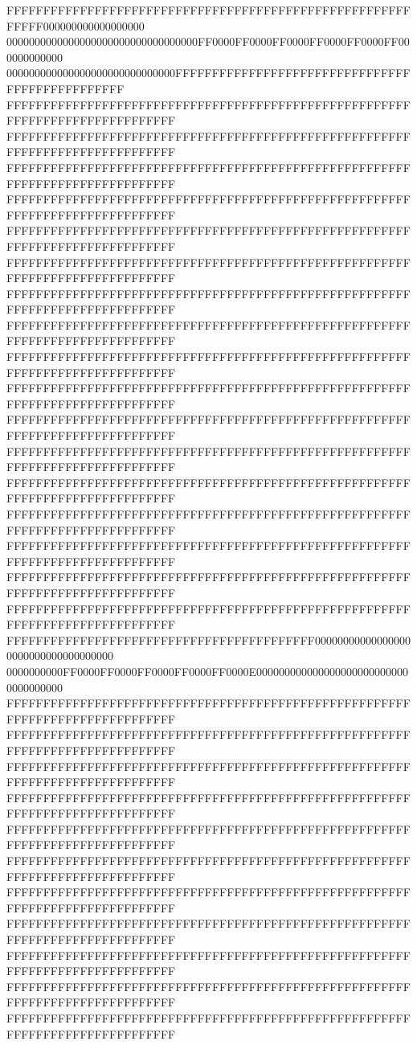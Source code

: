 FFFFFFFFFFFFFFFFFFFFFFFFFFFFFFFFFFFFFFFFFFFFFFFFFFFFFFFFFFFF000000000000000000
0000000000000000000000000000000000FF0000FF0000FF0000FF0000FF0000FF000000000000
000000000000000000000000000000FFFFFFFFFFFFFFFFFFFFFFFFFFFFFFFFFFFFFFFFFFFFFFFF
FFFFFFFFFFFFFFFFFFFFFFFFFFFFFFFFFFFFFFFFFFFFFFFFFFFFFFFFFFFFFFFFFFFFFFFFFFFFFF
FFFFFFFFFFFFFFFFFFFFFFFFFFFFFFFFFFFFFFFFFFFFFFFFFFFFFFFFFFFFFFFFFFFFFFFFFFFFFF
FFFFFFFFFFFFFFFFFFFFFFFFFFFFFFFFFFFFFFFFFFFFFFFFFFFFFFFFFFFFFFFFFFFFFFFFFFFFFF
FFFFFFFFFFFFFFFFFFFFFFFFFFFFFFFFFFFFFFFFFFFFFFFFFFFFFFFFFFFFFFFFFFFFFFFFFFFFFF
FFFFFFFFFFFFFFFFFFFFFFFFFFFFFFFFFFFFFFFFFFFFFFFFFFFFFFFFFFFFFFFFFFFFFFFFFFFFFF
FFFFFFFFFFFFFFFFFFFFFFFFFFFFFFFFFFFFFFFFFFFFFFFFFFFFFFFFFFFFFFFFFFFFFFFFFFFFFF
FFFFFFFFFFFFFFFFFFFFFFFFFFFFFFFFFFFFFFFFFFFFFFFFFFFFFFFFFFFFFFFFFFFFFFFFFFFFFF
FFFFFFFFFFFFFFFFFFFFFFFFFFFFFFFFFFFFFFFFFFFFFFFFFFFFFFFFFFFFFFFFFFFFFFFFFFFFFF
FFFFFFFFFFFFFFFFFFFFFFFFFFFFFFFFFFFFFFFFFFFFFFFFFFFFFFFFFFFFFFFFFFFFFFFFFFFFFF
FFFFFFFFFFFFFFFFFFFFFFFFFFFFFFFFFFFFFFFFFFFFFFFFFFFFFFFFFFFFFFFFFFFFFFFFFFFFFF
FFFFFFFFFFFFFFFFFFFFFFFFFFFFFFFFFFFFFFFFFFFFFFFFFFFFFFFFFFFFFFFFFFFFFFFFFFFFFF
FFFFFFFFFFFFFFFFFFFFFFFFFFFFFFFFFFFFFFFFFFFFFFFFFFFFFFFFFFFFFFFFFFFFFFFFFFFFFF
FFFFFFFFFFFFFFFFFFFFFFFFFFFFFFFFFFFFFFFFFFFFFFFFFFFFFFFFFFFFFFFFFFFFFFFFFFFFFF
FFFFFFFFFFFFFFFFFFFFFFFFFFFFFFFFFFFFFFFFFFFFFFFFFFFFFFFFFFFFFFFFFFFFFFFFFFFFFF
FFFFFFFFFFFFFFFFFFFFFFFFFFFFFFFFFFFFFFFFFFFFFFFFFFFFFFFFFFFFFFFFFFFFFFFFFFFFFF
FFFFFFFFFFFFFFFFFFFFFFFFFFFFFFFFFFFFFFFFFFFFFFFFFFFFFFFFFFFFFFFFFFFFFFFFFFFFFF
FFFFFFFFFFFFFFFFFFFFFFFFFFFFFFFFFFFFFFFFFFFFFFFFFFFFFFFFFFFFFFFFFFFFFFFFFFFFFF
FFFFFFFFFFFFFFFFFFFFFFFFFFFFFFFFFFFFFFFFFF000000000000000000000000000000000000
0000000000FF0000FF0000FF0000FF0000FF0000E0000000000000000000000000000000000000
FFFFFFFFFFFFFFFFFFFFFFFFFFFFFFFFFFFFFFFFFFFFFFFFFFFFFFFFFFFFFFFFFFFFFFFFFFFFFF
FFFFFFFFFFFFFFFFFFFFFFFFFFFFFFFFFFFFFFFFFFFFFFFFFFFFFFFFFFFFFFFFFFFFFFFFFFFFFF
FFFFFFFFFFFFFFFFFFFFFFFFFFFFFFFFFFFFFFFFFFFFFFFFFFFFFFFFFFFFFFFFFFFFFFFFFFFFFF
FFFFFFFFFFFFFFFFFFFFFFFFFFFFFFFFFFFFFFFFFFFFFFFFFFFFFFFFFFFFFFFFFFFFFFFFFFFFFF
FFFFFFFFFFFFFFFFFFFFFFFFFFFFFFFFFFFFFFFFFFFFFFFFFFFFFFFFFFFFFFFFFFFFFFFFFFFFFF
FFFFFFFFFFFFFFFFFFFFFFFFFFFFFFFFFFFFFFFFFFFFFFFFFFFFFFFFFFFFFFFFFFFFFFFFFFFFFF
FFFFFFFFFFFFFFFFFFFFFFFFFFFFFFFFFFFFFFFFFFFFFFFFFFFFFFFFFFFFFFFFFFFFFFFFFFFFFF
FFFFFFFFFFFFFFFFFFFFFFFFFFFFFFFFFFFFFFFFFFFFFFFFFFFFFFFFFFFFFFFFFFFFFFFFFFFFFF
FFFFFFFFFFFFFFFFFFFFFFFFFFFFFFFFFFFFFFFFFFFFFFFFFFFFFFFFFFFFFFFFFFFFFFFFFFFFFF
FFFFFFFFFFFFFFFFFFFFFFFFFFFFFFFFFFFFFFFFFFFFFFFFFFFFFFFFFFFFFFFFFFFFFFFFFFFFFF
FFFFFFFFFFFFFFFFFFFFFFFFFFFFFFFFFFFFFFFFFFFFFFFFFFFFFFFFFFFFFFFFFFFFFFFFFFFFFF
